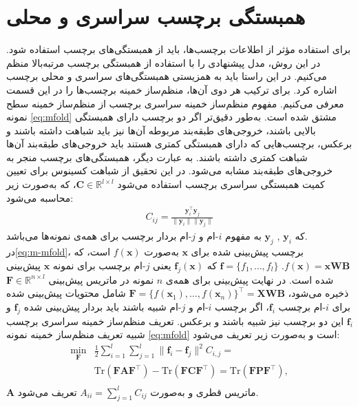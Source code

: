 \section{همبستگی برچسب سراسری و محلی}\label{GLOCAL}
برای استفاده مؤثر از اطلاعات برچسب‌ها، باید از همبستگی‌های برچسب استفاده شود. در این روش، مدل پیشنهادی را با استفاده از همبستگی برچسب مرتبه‌بالا منظم می‌کنیم. در این راستا باید به همزیستی همبستگی‌های سراسری و محلی برچسب اشاره کرد. برای ترکیب هر دوی آن‌ها، منظم‌ساز خمینه برچسب‌ها را در این قسمت معرفی می‌کنیم. مفهوم منظم‌ساز خمینه سراسری برچسب‌ ‌از منظم‌ساز خمینه سطح نمونه \eqref{eq:mfold} مشتق شده است. به‌طور دقیق‌تر اگر دو برچسب دارای همبستگی بالایی باشند، خروجی‌های طبقه‌بند مربوطه آن‌ها نیز باید شباهت داشته باشند و برعکس، برچسب‌هایی که دارای همبستگی کمتری هستند باید خروجی‌های طبقه‌بند آن‌ها شباهت کمتری داشته باشند. به عبارت دیگر، همبستگی‌های برچسب منجر به خروجی‌های طبقه‌بند مشابه می‌شود. در این تحقیق از شباهت کسینوس برای تعیین کمیت همبستگی سراسری برچسب استفاده می‌شود $\bm{C} \in\mathbb{R}^{l \times l}$، که به‌صورت زیر محاسبه می‌شود: 
\begin{align}\label{eq:gloCor}	
	{{{C}_{ij}=\frac{\bm{y}^\top_{i}{\bm{y}_{j}}}{{\lVert{\bm{y}_i}\lVert} \lVert{\bm{y}_{j}}\lVert}}}
\end{align}
که
$\bm{y}_i$ 
, 
$\bm{y}_j$
به مفهوم $i$-ام و $j$-ام بردار برچسب برای همه‌ی نمونه‌ها می‌باشد.‎\\
در\eqref{eq:m-mfold}، برچسب پیش‌بینی شده برای $\bm{x}$ به‌صورت $f(\bm{x})$ است، که $f(\bm{x}) = \bm{x}\bm{WB}$. 
$\bm{f} = \{{f}_1, {\dots}, {f}_l\}$
که $\bm{f}_j(\bm{x})$ یعنی $j$-ام برچسب برای نمونه $\bm{x}$ پیش‌بینی شده است. در نهایت پیش‌بینی برای همه‌ی ${n}$ نمونه در ماتریس پیش‌بینی $\bm{F}\in\mathbb{R}^{n \times l}$ ذخیره می‌شود،‌ $\bm{F}= \{f({\bm{x}}_1),{\dots},f({\bm{x}}_n)\}^\top = \bm{XWB}$ شامل محتویات پیش‌بینی شده برای $i$-ام برچسب $\bm{f}_i$، اگر برچسب ${i}$-ام و ${j}$-ام شبیه باشند باید بردار پیش‌بینی شده
$\bm{f}_j$ و $\bm{f}_i$
این دو برچسب نیز شبیه باشند و برعکس. تعریف منظم‌ساز خمینه ‌سراسری برچسب شبیه تعریف منظم‌ساز خمینه نمونه \eqref{eq:mfold} است و به‌صورت زیر تعریف می‌شود:
\begin{align}\label{eq:glomfold}
	\min_{\bm{F}}&\frac{1}{2}\sum_{i=1}^l\sum_{j=1}^l\lVert\bm{f}_i-\bm{f}_j\rVert^2C_{i,j}=\nonumber\\
	&\mathrm{Tr}(\bm{FA}\bm{F}^\top)-\mathrm{Tr}(\bm{FC}\bm{F}^\top)=\mathrm{Tr}(\bm{FP}\bm{F}^\top),\nonumber\\
\end{align}
$\bm{A}$ ماتریس قطری و به‌صورت ${A}_{ii}=\sum_{j=1}^l {C}_{ij}$ تعریف می‌شود. 
